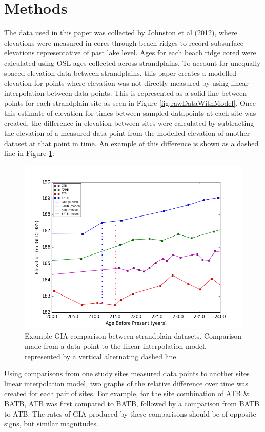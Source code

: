 \documentclass{article}
\begin{document}
 \section{Methods}
 The data used in this paper was collected by Johnston et al (2012), where elevations
 were measured in cores through beach ridges to record subsurface elevations
 representative of past lake level. Ages for each beach ridge cored were calculated
 using OSL ages collected across strandplains. To account for unequally spaced 
 elevation data between strandplains, this paper creates a modelled elevation for points where elevation was not directly
 measured by using linear interpolation between data points. This is
 represented as a solid line between points for each strandplain site
 as seen in Figure \ref{fig:rawDataWithModel}.
 Once this estimate of elevation for times between sampled datapoints at each site
 was created, the difference in elevation between sites were calculated by subtracting
 the elevation of a measured data point from the modelled elevation of another
 dataset at that point in time. An example of this difference is shown as a dashed line in
 Figure \ref{fig:rawDataWithModelZoomed}:
 \begin{figure}[h]
	\includegraphics[width=1.1\linewidth]{data/theDataZoomed.png}
	\caption{Example GIA comparison between strandplain datasets. Comparison made from a data point to the linear interpolation
	model, represented by a vertical alternating dashed line}
	\label{fig:rawDataWithModelZoomed}
 \end{figure}
 Using comparisons from one study sites measured data points to another sites
 linear interpolation model,
 two graphs of the relative difference over time was created for each pair
 of sites. For example, for
 the site combination of ATB \& BATB, ATB was first compared to BATB, followed 
 by a comparison from BATB to ATB. The rates of GIA produced by these comparisons
 should be of opposite signs, but similar magnitudes.
 
\end{document}
